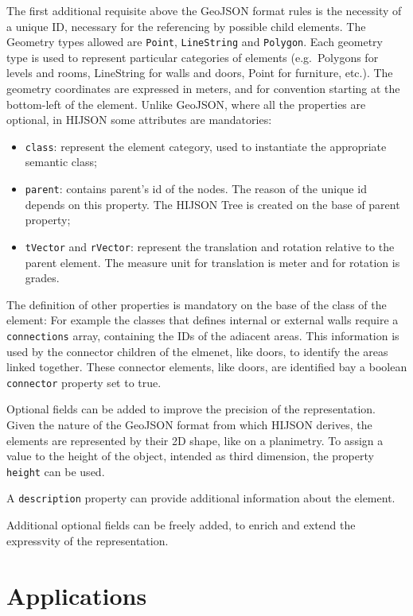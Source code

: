 \documentclass{sig-alternate}
\begin{document}
The first additional requisite above the GeoJSON format rules is the
necessity of a unique ID, necessary for the referencing by possible
child elements. The Geometry types allowed are \texttt{Point},
\texttt{LineString} and \texttt{Polygon}. Each geometry type is used to
represent particular categories of elements (e.g.~Polygons for levels
and rooms, LineString for walls and doors, Point for furniture, etc.).
The geometry coordinates are expressed in meters, and for convention
starting at the bottom-left of the element. Unlike GeoJSON, where all
the properties are optional, in HIJSON some attributes are mandatories:

\begin{itemize}
\itemsep1pt\parskip0pt
\item
  \texttt{class}: represent the element category, used to instantiate
  the appropriate semantic class;
\item
  \texttt{parent}: contains parent's id of the nodes. The reason of the
  unique id depends on this property. The HIJSON Tree is created on the
  base of parent property;
\item
  \texttt{tVector} and \texttt{rVector}: represent the translation and
  rotation relative to the parent element. The measure unit for
  translation is meter and for rotation is grades.
\end{itemize}

The definition of other properties is mandatory on the base of the class
of the element: For example the classes that defines internal or
external walls require a \texttt{connections} array, containing the IDs
of the adiacent areas. This information is used by the connector
children of the elmenet, like doors, to identify the areas linked
together. These connector elements, like doors, are identified bay a
boolean \texttt{connector} property set to true.

Optional fields can be added to improve the precision of the
representation. Given the nature of the GeoJSON format from which HIJSON
derives, the elements are represented by their 2D shape, like on a
planimetry. To assign a value to the height of the object, intended as
third dimension, the property \texttt{height} can be used.

A \texttt{description} property can provide additional information about
the element.

Additional optional fields can be freely added, to enrich and extend the
expressvity of the representation.

\section{Applications}\label{applications}
\end{document}
